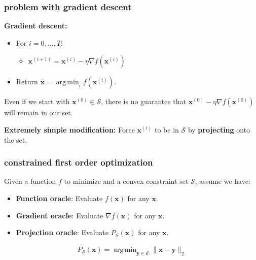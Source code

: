 \documentclass[compress]{beamer}
\newcommand{\bv}[1]{\mathbf{#1}}
\DeclareMathOperator*{\argmin}{arg\,min}
\begin{document}
\begin{frame}[t]
	\frametitle{problem with gradient descent}
	\textbf{Gradient descent:}
	\begin{itemize}
		\item For $i = 0,\ldots, T$:
		\begin{itemize}
			\item $\bv{x}^{(i+1)} = \bv{x}^{(i)} - \eta \nabla f(\bv{x}^{(i)})$
		\end{itemize}
		\item Return $\hat{\bv{x}} = \argmin_{i} f(\bv{x}^{(i)})$.
	\end{itemize}
	
	\begin{center}
		\alert{
		Even if we start with $\bv{x}^{(0)} \in \mathcal{S}$, there is no guarantee that $ \bv{x}^{(0)} - \eta \nabla f(\bv{x}^{(0)})$ will remain in our set.}
	\end{center}

	\textbf{Extremely simple modification:} Force $\bv{x}^{(i)}$ to be in $\mathcal{S}$ by \textbf{\alert{projecting}} onto the set.
\end{frame}

\begin{frame}
	\frametitle{constrained first order optimization}
	Given a function $f$ to minimize and a convex constraint set $\mathcal{S}$, assume we have:
	\begin{itemize}
		\item \textbf{Function oracle}: Evaluate $f(\bv{x})$ for any $\bv{x}$. 
		\item \textbf{Gradient oracle}: Evaluate $\nabla f(\bv{x})$ for any $\bv{x}$.
		\item \textbf{\alert{Projection oracle}}: Evaluate $P_{\mathcal{S}}(\bv{x})$ for any $\bv{x}$.
	\end{itemize}
\begin{align*}
	P_{\mathcal{S}}(\bv{x}) = \argmin_{\bv{y}\in \mathcal{S}} \|\bv{x} - \bv{y}\|_2
\end{align*}
\end{frame}
\end{document}
